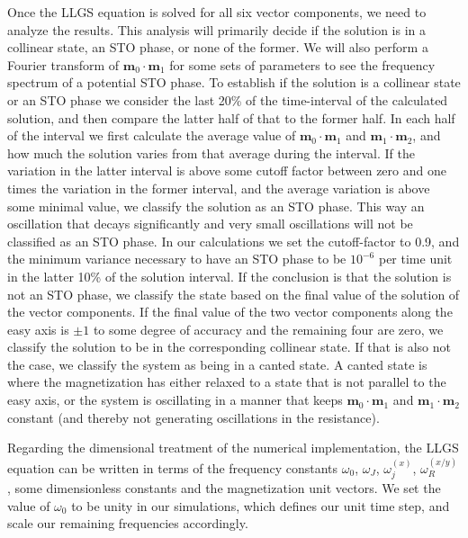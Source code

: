 Once the LLGS equation is solved for all six vector components, we need to analyze the results. This analysis will primarily decide if the solution is in a collinear state, an STO phase, or none of the former. We will also perform a Fourier transform of $\mathbold{m}_0\cdot\mathbold{m}_1$ for some sets of parameters to see the frequency spectrum of a potential STO phase. To establish if the solution is a collinear state or an STO phase we consider the last 20\% of the time-interval of the calculated solution, and then compare the latter half of that to the former half. In each half of the interval we first calculate the average value of $\mathbold{m}_0\cdot\mathbold{m}_1$ and $\mathbold{m}_1\cdot\mathbold{m}_2$, and how much the solution varies from that average during the interval. If the variation in the latter interval is above some cutoff factor between zero and one times the variation in the former interval, and the average variation is above some minimal value, we classify the solution as an STO phase. This way an oscillation that decays significantly and very small oscillations will not be classified as an STO phase. In our calculations we set the cutoff-factor to 0.9, and the minimum variance necessary to have an STO phase to be $10^{-6}$ per time unit in the latter 10\% of the solution interval. If the conclusion is that the solution is not an STO phase, we classify the state based on the final value of the solution of the vector components. If the final value of the two vector components along the easy axis is $\pm1$ to some degree of accuracy and the remaining four are zero, we classify the solution to be in the corresponding collinear state. If that is also not the case, we classify the system as being in a canted state. A canted state is where the magnetization has either relaxed to a state that is not parallel to the easy axis, or the system is oscillating in a manner that keeps $\mathbold{m}_0\cdot\mathbold{m}_1$ and $\mathbold{m}_1\cdot\mathbold{m}_2$ constant (and thereby not generating oscillations in the resistance). 

Regarding the dimensional treatment of the numerical implementation, the LLGS equation can be written in terms of the frequency constants $\omega_0$, $\omega_J$, $\omega_j^{(x)}$, $\omega_R^{(x/y)}$, some dimensionless constants and the magnetization unit vectors. We set the value of $\omega_0$ to be unity in our simulations, which defines our unit time step, and scale our remaining frequencies accordingly.
